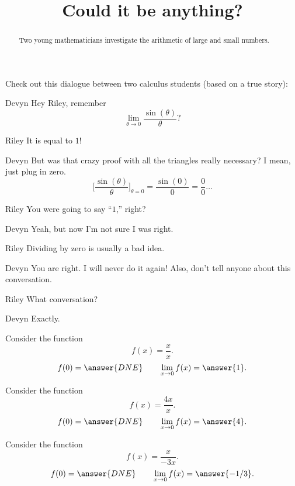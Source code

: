 \documentclass{ximera}
\title[Break-Ground:]{Could it be anything?}
\begin{document}
\begin{abstract}
Two young mathematicians investigate the arithmetic of large
and small numbers.
\end{abstract}
\maketitle


Check out this dialogue between two calculus students (based on a true
story):


\begin{dialogue}
\item[Devyn] Hey Riley, remember
  \[
  \lim_{\theta\to 0}\frac{\sin(\theta)}{\theta}?
  \]
\item[Riley] It is equal to $1$!
\item[Devyn] But was that crazy proof with all the triangles really
  necessary? I mean, just plug in zero. 
  \[
  \bigg[\frac{\sin(\theta)}{\theta}\bigg]_{\theta=0} = \frac{\sin(0)}{0}=\frac{0}{0}\dots
  \]
  \item[Riley] You were going to say ``$1$,'' right? 
  \item[Devyn] Yeah, but now I'm not sure I was right.
  \item[Riley] Dividing by zero is usually a bad idea.
  \item[Devyn] You are right. I will never do it again! Also, don't
    tell anyone about this conversation.
  \item[Riley] What conversation?
  \item[Devyn] Exactly.
\end{dialogue}



\begin{problem}
  Consider the function
  \[
  f(x) = \frac{x}{x}.
  \]
  \[
  f(0) = \answer{DNE}\qquad\lim_{x\to 0} f(x) = \answer{1}.
  \]
\end{problem}

\begin{problem}
  Consider the function
  \[
  f(x) = \frac{4x}{x}.
  \]
  \[
  f(0) = \answer{DNE}\qquad\lim_{x\to 0} f(x) = \answer{4}.
  \]
\end{problem}

\begin{problem}
  Consider the function
  \[
  f(x) = \frac{x}{-3x}.
  \]
  \[
  f(0) = \answer{DNE}\qquad\lim_{x\to 0} f(x) = \answer{-1/3}.
  \]
\end{problem}

%
\end{document}
